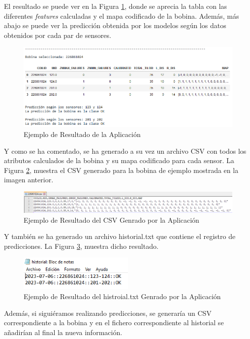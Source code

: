 El resultado se puede ver en la Figura \ref{f:apli1}, donde se aprecia la tabla con las diferentes \emph{features} calculadas y el mapa codificado de la bobina. Además, más abajo se puede ver la predicción obtenida por los modelos según los datos obtenidos por cada par de sensores.

\begin{figure}[h]
 \centering
  \includegraphics[width=1\textwidth]{img/salidaAp.PNG}
 \caption{Ejemplo de Resultado de la Aplicación}
 \label{f:apli1}
\end{figure}

Y como se ha comentado, se ha generado a su vez un archivo CSV con todos los atributos calculados de la bobina y su mapa codificado para cada sensor. La Figura \ref{f:apli2}, muestra el CSV generado para la bobina de ejemplo mostrada en la imagen anterior. 

\begin{figure}[h]
 \centering
  \includegraphics[width=1\textwidth]{img/csv.PNG}
 \caption{Ejemplo de Resultado del CSV Genrado por la Aplicación}
 \label{f:apli2}
\end{figure}

Y también se ha generado un archivo historial.txt que contiene el registro de predicciones. La Figura \ref{f:apli3}, muestra dicho resultado. 

\begin{figure}[h]
 \centering
  \includegraphics[width=0.5\textwidth]{img/historial.PNG}
 \caption{Ejemplo de Resultado del histroial.txt Genrado por la Aplicación}
 \label{f:apli3}
\end{figure}

Además, si siguiéramos realizando predicciones, se generaría un CSV correspondiente a la bobina y en el fichero correspondiente al historial se añadirían al final la nueva información.
